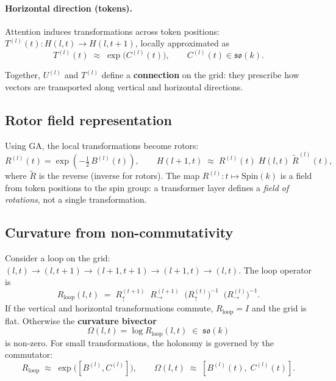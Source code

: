 \documentclass[11pt, twoside, openright]{memoir}
\numberwithin{equation}{chapter}
\begin{document}
\paragraph{Horizontal direction (tokens).}
Attention induces transformations across token positions:
$T^{(l)}(t) : H(l,t) \to H(l,t+1)$,
locally approximated as
\begin{equation}
  T^{(l)}(t) \;\approx\; \exp\!\big(C^{(l)}(t)\big),
  \qquad C^{(l)}(t) \in \mathfrak{so}(k).
\end{equation}

Together, $U^{(l)}$ and $T^{(l)}$ define a \textbf{connection} on the
grid: they prescribe how vectors are transported along vertical and
horizontal directions.

\subsection{Rotor field representation}

Using GA, the local transformations become rotors:
\begin{equation}
  R^{(l)}(t) = \exp\!\left(-\tfrac{1}{2}\, B^{(l)}(t)\right),
  \qquad
  H(l+1,t) \;\approx\; R^{(l)}(t)\; H(l,t)\; \widetilde{R}^{(l)}(t),
\end{equation}
where $\widetilde{R}$ is the reverse (inverse for rotors).  The
map $R^{(l)} : t \mapsto \mathrm{Spin}(k)$ is a field from token
positions to the spin group: a transformer layer defines a
\emph{field of rotations}, not a single transformation.

\subsection{Curvature from non-commutativity}

Consider a loop on the grid:
$(l,t) \to (l,t\!+\!1) \to (l\!+\!1,t\!+\!1) \to (l\!+\!1,t) \to (l,t)$.
The loop operator is
\begin{equation}
  R_{\text{loop}}(l,t) \;=\;
  R_{\uparrow}^{(t+1)}\;\;
  R_{\rightarrow}^{(l+1)}\;\;
  \big(R_{\uparrow}^{(t)}\big)^{-1}\;\;
  \big(R_{\rightarrow}^{(l)}\big)^{-1}.
\end{equation}
If the vertical and horizontal transformations commute,
$R_{\text{loop}} = I$ and the grid is flat.  Otherwise the
\textbf{curvature bivector}
\begin{equation}
  \Omega(l,t) = \log R_{\text{loop}}(l,t) \;\in\; \mathfrak{so}(k)
\end{equation}
is non-zero.  For small transformations, the holonomy is governed by
the commutator:
\begin{equation}
  R_{\text{loop}} \;\approx\; \exp\!\big([B^{(l)}, C^{(l)}]\big),
  \qquad
  \Omega(l,t) \;\approx\; [B^{(l)}(t),\; C^{(l)}(t)].
\end{equation}
\end{document}
